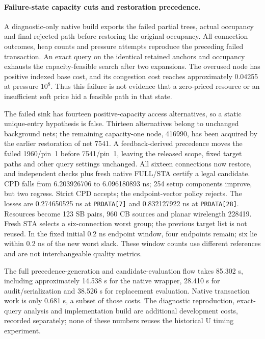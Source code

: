 \paragraph{Failure-state capacity cuts and restoration precedence.}
A diagnostic-only native build exports the failed partial trees, actual occupancy and final rejected path before restoring the original occupancy. All connection outcomes, heap counts and pressure attempts reproduce the preceding failed transaction. An exact query on the identical retained anchors and occupancy exhausts the capacity-feasible search after two expansions. The overused node has positive indexed base cost, and its congestion cost reaches approximately 0.04255 at pressure $10^8$. Thus this failure is not evidence that a zero-priced resource or an insufficient soft price hid a feasible path in that state.

The failed sink has fourteen positive-capacity access alternatives, so a static unique-entry hypothesis is false. Thirteen alternatives belong to unchanged background nets; the remaining capacity-one node, 416990, has been acquired by the earlier restoration of net 7541. A feedback-derived precedence moves the failed 1960/pin~1 before 7541/pin~1, leaving the released scope, fixed target paths and other query settings unchanged. All sixteen connections now restore, and independent checks plus fresh native FULL/STA certify a legal candidate. CPD falls from 6.203926706 to 6.096180893 ns; 254 setup components improve, but two regress. Strict CPD accepts; the endpoint-vector policy rejects. The losses are 0.274650525 ns at \texttt{PRDATA[7]} and 0.832127922 ns at \texttt{PRDATA[28]}. Resources become 123 SB pairs, 960 CB sources and planar wirelength 228419. Fresh STA selects a six-connection worst group; the previous target list is not reused. In the fixed initial 0.2 ns endpoint window, four endpoints remain; six lie within 0.2 ns of the new worst slack. These window counts use different references and are not interchangeable quality metrics.

The full precedence-generation and candidate-evaluation flow takes 85.302 s, including approximately 14.538 s for the native wrapper, 28.410 s for audit/serialization and 38.526 s for replacement evaluation. Native transaction work is only 0.681 s, a subset of those costs. The diagnostic reproduction, exact-query analysis and implementation build are additional development costs, recorded separately; none of these numbers reuses the historical U timing experiment.


